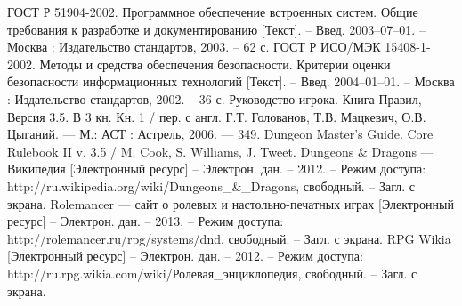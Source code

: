 \begin{thebibliography}{@@@@}
   ГОСТ Р 51904-2002. Программное обеспечение встроенных систем. Общие требования к разработке и документированию [Текст]. – Введ. 2003–07–01. – Москва : Издательство стандартов, 2003. – 62 с. 
   ГОСТ Р ИСО/МЭК 15408-1-2002. Методы и средства обеспечения безопасности. Критерии оценки безопасности информационных технологий [Текст]. – Введ. 2004–01–01. – Москва : Издательство стандартов, 2002. – 36 с.
   Руководство игрока. Книга Правил, Версия 3.5. В 3 кн. Кн. 1 / пер. с англ. Г.Т. Голованов, Т.В. Мацкевич, О.В. Цыганий. — М.: АСТ : Астрель, 2006. — 349.
   Dungeon Master's Guide. Core Rulebook II v. 3.5 / M. Cook, S. Williams, J. Tweet.
   Dungeons \& Dragons — Википедия [Электронный ресурс] – Электрон. дан. – 2012. – Режим доступа: http://ru.wikipedia.org/wiki/Dungeons\_\&\_Dragons, свободный. – Загл. с экрана.
   Rolemancer — сайт о ролевых и настольно-печатных играх [Электронный ресурс] – Электрон. дан. – 2013. – Режим доступа: http://rolemancer.ru/rpg/systems/dnd, свободный. – Загл. с экрана.
   RPG Wikia [Электронный ресурс] – Электрон. дан. – 2012. – Режим доступа: http://ru.rpg.wikia.com/wiki/Ролевая\_энциклопедия, свободный. – Загл. с экрана.
\end{thebibliography}
